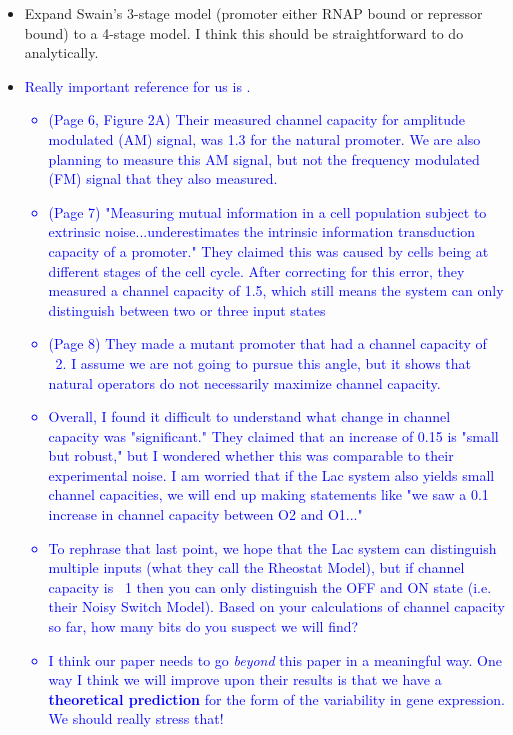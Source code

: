 \begin{itemize}
	\item Expand Swain's 3-stage model (promoter either RNAP bound or repressor bound) to a 4-stage model. I think this should be straightforward to do analytically.
	
	
	\item \textcolor{blue}{Really important reference for us is \cite{Hansen2015}.
		\begin{itemize}
			\item (Page 6, Figure 2A) Their measured channel capacity for amplitude modulated (AM) signal, was 1.3 for the natural promoter. We are also planning to measure this AM signal, but not the frequency modulated (FM) signal that they also measured.
			\item (Page 7) "Measuring mutual information in a cell population subject to extrinsic noise...underestimates the intrinsic information transduction capacity of a promoter." They claimed this was caused by cells being at different stages of the cell cycle. After correcting for this error, they measured a channel capacity of 1.5, which still means the system can only distinguish between two or three input states
			\item (Page 8) They made a mutant promoter that had a channel capacity of ~2. I assume we are not going to pursue this angle, but it shows that natural operators do not necessarily maximize channel capacity.
			\item Overall, I found it difficult to understand what change in channel capacity was "significant." They claimed that an increase of 0.15 is "small but robust," but I wondered whether this was comparable to their experimental noise. I am worried that if the Lac system also yields small channel capacities, we will end up making statements like "we saw a 0.1 increase in channel capacity between O2 and O1..."
			\item To rephrase that last point, we hope that the Lac system can distinguish multiple inputs (what they call the Rheostat Model), but if channel capacity is ~1 then you can only distinguish the OFF and ON state (i.e. their Noisy Switch Model). Based on your calculations of channel capacity so far, how many bits do you suspect we will find?
			\item I think our paper needs to go \textit{beyond} this paper in a meaningful way. One way I think we will improve upon their results is that we have a \textbf{theoretical prediction} for the form of the variability in gene expression. We should really stress that!
		\end{itemize}
	}
	

\end{itemize}
